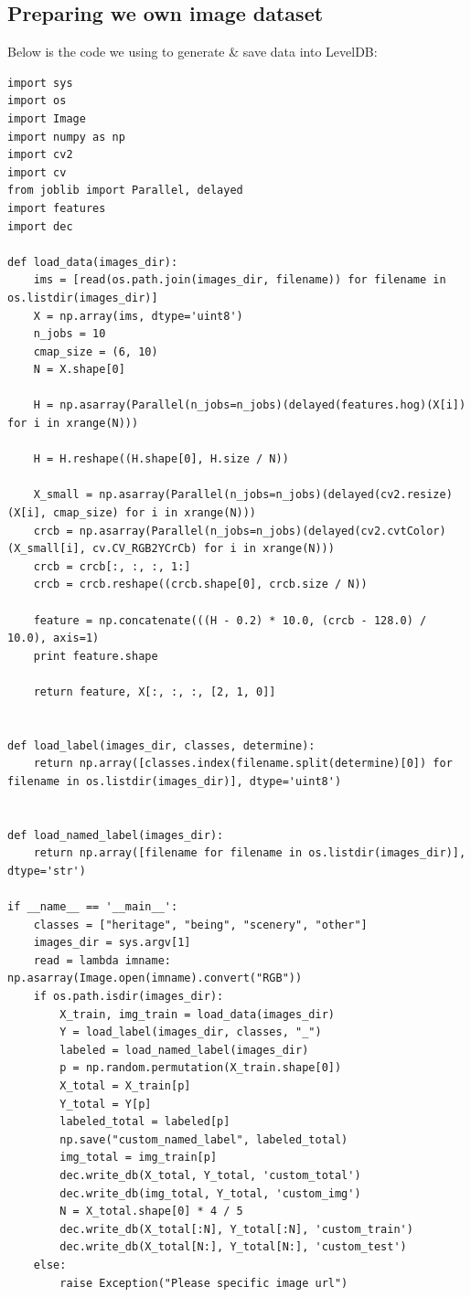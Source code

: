 \documentclass[11pt]{article}
\begin{document}
\subsection{Preparing we own image dataset}
Below is the code we using to generate \& save data into LevelDB:
\begin{lstlisting}
import sys
import os
import Image
import numpy as np
import cv2
import cv
from joblib import Parallel, delayed
import features
import dec

def load_data(images_dir):
    ims = [read(os.path.join(images_dir, filename)) for filename in os.listdir(images_dir)]
    X = np.array(ims, dtype='uint8')
    n_jobs = 10
    cmap_size = (6, 10)
    N = X.shape[0]

    H = np.asarray(Parallel(n_jobs=n_jobs)(delayed(features.hog)(X[i]) for i in xrange(N)))

    H = H.reshape((H.shape[0], H.size / N))

    X_small = np.asarray(Parallel(n_jobs=n_jobs)(delayed(cv2.resize)(X[i], cmap_size) for i in xrange(N)))
    crcb = np.asarray(Parallel(n_jobs=n_jobs)(delayed(cv2.cvtColor)(X_small[i], cv.CV_RGB2YCrCb) for i in xrange(N)))
    crcb = crcb[:, :, :, 1:]
    crcb = crcb.reshape((crcb.shape[0], crcb.size / N))

    feature = np.concatenate(((H - 0.2) * 10.0, (crcb - 128.0) / 10.0), axis=1)
    print feature.shape

    return feature, X[:, :, :, [2, 1, 0]]


def load_label(images_dir, classes, determine):
    return np.array([classes.index(filename.split(determine)[0]) for filename in os.listdir(images_dir)], dtype='uint8')


def load_named_label(images_dir):
    return np.array([filename for filename in os.listdir(images_dir)], dtype='str')

if __name__ == '__main__':
    classes = ["heritage", "being", "scenery", "other"]
    images_dir = sys.argv[1]
    read = lambda imname: np.asarray(Image.open(imname).convert("RGB"))
    if os.path.isdir(images_dir):
        X_train, img_train = load_data(images_dir)
        Y = load_label(images_dir, classes, "_")
        labeled = load_named_label(images_dir)
        p = np.random.permutation(X_train.shape[0])
        X_total = X_train[p]
        Y_total = Y[p]
        labeled_total = labeled[p]
        np.save("custom_named_label", labeled_total)
        img_total = img_train[p]
        dec.write_db(X_total, Y_total, 'custom_total')
        dec.write_db(img_total, Y_total, 'custom_img')
        N = X_total.shape[0] * 4 / 5
        dec.write_db(X_total[:N], Y_total[:N], 'custom_train')
        dec.write_db(X_total[N:], Y_total[N:], 'custom_test')
    else:
        raise Exception("Please specific image url")

\end{lstlisting}
\end{document}
